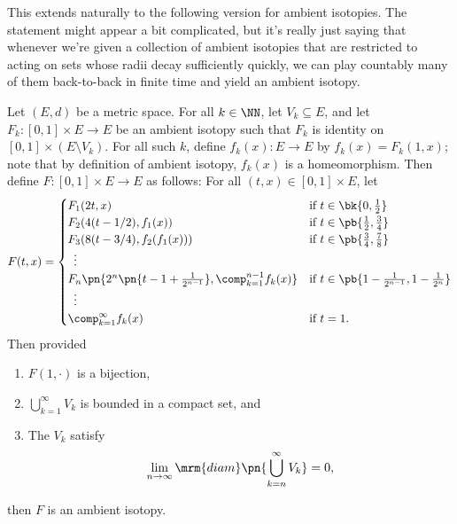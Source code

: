 This extends naturally to the following version for ambient isotopies.
The statement might appear a bit complicated, but it's really just
saying that whenever we're given a collection of ambient isotopies
that are restricted to acting on sets whose radii decay sufficiently
quickly, we can play countably many of them back-to-back in finite
time and yield an ambient isotopy.
\begin{theorem}\label{thm:uniformly-convergent-ambient-isotopy}
  Let $(E,d)$ be a metric space. For all $k \in \NN$, let $V_k
  \subseteq E$, and let $F_k : [0,1] \times E \to E$ be an ambient
  isotopy such that $F_k$ is identity on $[0,1] \times (E \setminus
  V_k)$. For all such $k$, define $f_k(x) : E \to E$ by $f_k(x) =
  F_k(1, x)$; note that by definition of ambient isotopy, $f_k(x)$ is
  a homeomorphism. Then define $F : [0,1] \times E \to E$ as follows:
  For all $(t,x) \in [0,1] \times E$, let
  \[
    F(t, x) =
    \begin{cases}
      F_1(2t, x) & \text{if } t \in \bk{0, \frac{1}{2}} \\
      F_2(4 (t - 1/2), f_1(x)) & \text{if } t \in \pb{\frac{1}{2},
        \frac{3}{4}} \\
      F_3(8 (t - 3/4), f_2(f_1(x))) & \text{if } t \in
      \pb{\frac{3}{4}, \frac{7}{8}} \\
      \hspace{.5em} \vdots & \\
      F_n\pn{2^n \pn{t - 1 + \frac{1}{2^{n-1}}}, \comp_{k=1}^{n-1}
        f_k(x)} & \text{if } t \in \pb{1 - \frac{1}{2^{n-1}}, 1 -
        \frac{1}{2^n}} \\
      \hspace{.5em} \vdots & \\
      \comp_{k=1}^\infty f_k(x) & \text{if }t = 1.
    \end{cases}
  \]
  Then provided
  \begin{enumerate}
    \item $F(1, \cdot)$ is a bijection,
    \item $\bigcup_{k=1}^\infty V_k$ is bounded in a compact set, and
    \item The $V_k$ satisfy
      \[
      \lim_{n\to\infty} \mrm{diam}\pn{\bigcup_{k=n}^\infty  V_k} = 0,
      \]
  \end{enumerate}
  then $F$ is an ambient isotopy.
\end{theorem}
